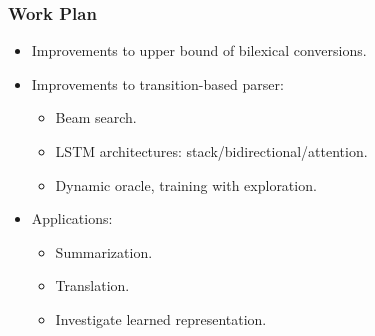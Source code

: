 \documentclass[t,handout,xcolor={svgnames}]{beamer}
\begin{document}
\begin{frame}
\frametitle{Work Plan}
\begin{itemize}
 \item Improvements to upper bound of bilexical conversions.
 \item Improvements to transition-based parser:
 \begin{itemize}
  \item Beam search.
  \item LSTM architectures: stack/bidirectional/attention.
  \item Dynamic oracle, training with exploration.
 \end{itemize}
 \item Applications:
 \begin{itemize}
  \item Summarization.
  \item Translation.
  \item Investigate learned representation.
 \end{itemize}
\end{itemize}
\end{frame}
\end{document}
